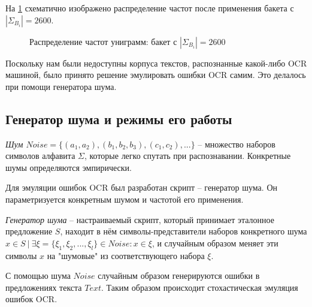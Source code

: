 На \cref{fig:bucket_pic} схематично изображено распределение частот после применения бакета с $|\Sigma_{B_i}| = 2600$.

\begin{figure}[H]
	\caption{Распределение частот униграмм: бакет с $|\Sigma_{B_i}| = 2600$}
	\label{fig:bucket_pic}
\end{figure}

Поскольку нам были недоступны корпуса текстов, распознанные какой-либо OCR машиной, было принято решение эмулировать ошибки OCR самим. Это делалось при помощи генератора шума.

\subsection{ Генератор шума и режимы его работы }

\begin{definition}
	{\textit{Шум $Noise = \{ (a_1, a_2), (b_1, b_2, b_3), (c_1, c_2), ... \}$}} -- множество наборов символов алфавита $\Sigma$, которые легко спутать при распознавании. Конкретные шумы определяются эмпирически. 
\end{definition}

Для эмуляции ошибок OCR был разработан скрипт -- генератор шума. Он параметризуется конкретным шумом и частотой его применения.

\begin{definition}
	{\textit{Генератор шума}} -- настраиваемый скрипт, который принимает эталонное предложение $S$, находит в нём символы-представители наборов конкретного шума $x \in S\ |\ \exists \xi = \{ \xi_1, \xi_2, ..., \xi_l \} \in Noise : x \in \xi$, и случайным образом меняет эти символы $x$ на "шумовые" из соответствующего набора $\xi$.
\end{definition}

С помощью шума $Noise$ случайным образом генерируются ошибки в предложениях текста $Text$. Таким образом происходит стохастическая эмуляция ошибок OCR. 

